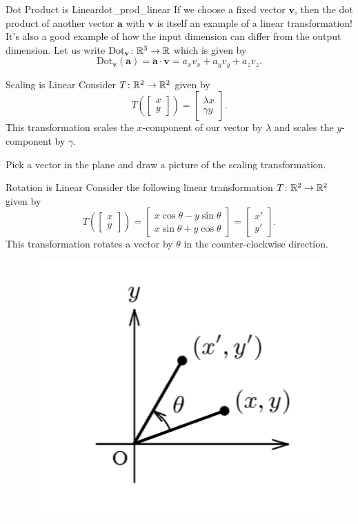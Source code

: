         \begin{ex}{Dot Product is Linear}{dot_prod_linear}
        If we choose a fixed vector $\mathbf{v}$, then the dot product of another vector $\mathbf{a}$ with $\mathbf{v}$ is itself an example of a linear transformation! It's also a good example of how the input dimension can differ from the output dimension.  Let us write $\textrm{Dot}_\mathbf{v}\colon \mathbb{R}^3 \to \mathbb{R}$ which is given by
        \[
        \textrm{Dot}_\mathbf{v}(\mathbf{a})=\mathbf{a}\cdot \mathbf{v}=a_xv_x+a_yv_y+a_zv_z.
        \]
        \end{ex}
        
        \begin{ex}{Scaling is Linear}
        Consider $T \colon \mathbb{R}^2 \to \mathbb{R}^2$ given by
        \[
        T\left( \begin{bmatrix} x\\ y \end{bmatrix}\right)
        = \begin{bmatrix} \lambda x\\ \gamma y \end{bmatrix}.
        \]
        This transformation scales the $x$-component of our vector by $\lambda$ and scales the $y$-component by $\gamma$.
        \end{ex}
        
        \begin{exercise}
        Pick a vector in the plane and draw a picture of the scaling transformation.
        \end{exercise}
        
        \begin{ex}{Rotation is Linear}
        Consider the following linear transformation $T\colon \mathbb{R}^2 \to \mathbb{R}^2$ given by
        \[
        T\left( \begin{bmatrix} x\\ y \end{bmatrix} \right)
        = \begin{bmatrix} x \cos \theta - y \sin \theta\\ x \sin \theta +y \cos \theta \end{bmatrix} = \begin{bmatrix} x'\\ y' \end{bmatrix}.
        \]
        This transformation rotates a vector by $\theta$ in the counter-clockwise direction. 
        \begin{figure}[H]
            \centering
            \includegraphics[width=.3\textwidth]{Figures/plane_rotation.png}
        \end{figure}
        \end{ex}
        
